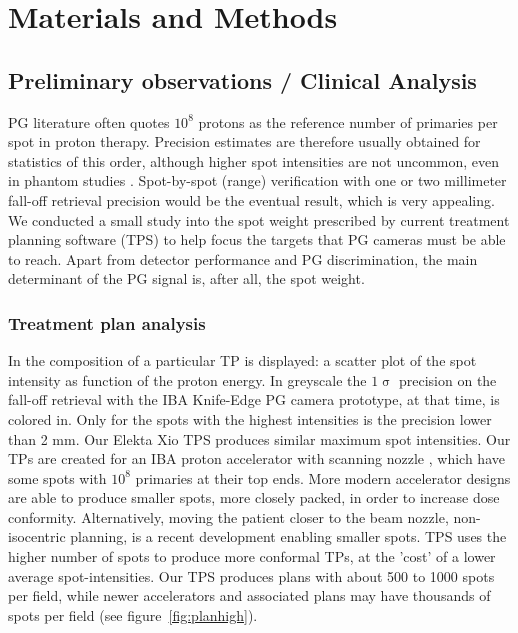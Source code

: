 \documentclass[a4paper,english]{article}
\begin{document}
\section{Materials and Methods}

\subsection{Preliminary observations / Clinical Analysis}

PG literature often quotes $10^8$ protons as the reference number of primaries per spot in proton therapy. Precision estimates are therefore usually obtained for statistics of this order, although higher spot intensities are not uncommon, even in phantom studies \citep{Priegnitz2016}. Spot-by-spot (range) verification with one or two millimeter fall-off retrieval precision would be the eventual result, which is very appealing. We conducted a small study into the spot weight prescribed by current treatment planning software (TPS) to help focus the targets that PG cameras must be able to reach. Apart from detector performance and PG discrimination, the main determinant of the PG signal is, after all, the spot weight.

\subsubsection{Treatment plan analysis}\label{sec:tpanalysis}

In \cite{Smeets2012} the composition of a particular TP is displayed: a scatter plot of the spot intensity as function of the proton energy. In greyscale the $1\upsigma$ precision on the fall-off retrieval with the IBA Knife-Edge PG camera prototype, at that time, is colored in. Only for the spots with the highest intensities is the precision lower than 2 mm. Our Elekta Xio TPS produces similar maximum spot intensities. Our TPs are created for an IBA proton accelerator with scanning nozzle \citep{Grevillot2011}, which have some spots with $10^8$ primaries at their top ends. More modern accelerator designs are able to produce smaller spots, more closely packed, in order to increase dose conformity. Alternatively, moving the patient closer to the beam nozzle, non-isocentric planning, is a recent development \cite{Grevillot2015} enabling smaller spots. TPS uses the higher number of spots to produce more conformal TPs, at the 'cost' of a lower average spot-intensities. Our TPS produces plans with about 500 to 1000 spots per field, while newer accelerators and associated plans may have thousands of spots per field (see figure~\ref{fig:planhigh}).
\end{document}

